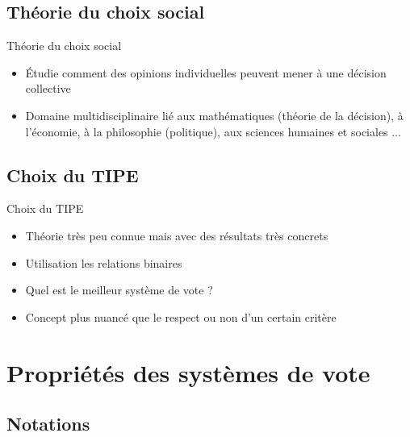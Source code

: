 \documentclass[11pt]{beamer}
\begin{document}
	\subsection{Théorie du choix social}
	\begin{frame}{Théorie du choix social}
		\begin{itemize}
			\item Étudie comment des opinions individuelles peuvent mener à une décision collective
			\item Domaine multidisciplinaire lié aux mathématiques (théorie de la décision), à l'économie, à la philosophie (politique), aux sciences humaines et sociales $\ldots$
		\end{itemize}
	\end{frame}
	
	\subsection{Choix du TIPE}
	\begin{frame}{Choix du TIPE}
		\begin{itemize}
			\item Théorie très peu connue mais avec des résultats très concrets
			\item Utilisation les relations binaires
			\item Quel est le meilleur système de vote ?
			\item Concept plus nuancé que le respect ou non d'un certain critère
		\end{itemize}
	\end{frame}
	
	\section{Propriétés des systèmes de vote}
	
	\subsection{Notations}
	
\end{document}

